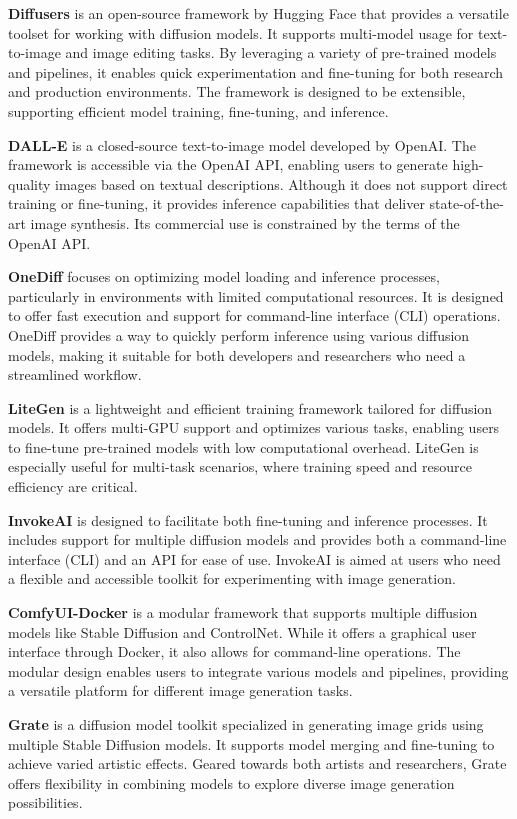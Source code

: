 \textbf{Diffusers} is an open-source framework by Hugging Face that provides a versatile toolset for working with diffusion models. It supports multi-model usage for text-to-image and image editing tasks. By leveraging a variety of pre-trained models and pipelines, it enables quick experimentation and fine-tuning for both research and production environments. The framework is designed to be extensible, supporting efficient model training, fine-tuning, and inference.

\textbf{DALL-E} is a closed-source text-to-image model developed by OpenAI. The framework is accessible via the OpenAI API, enabling users to generate high-quality images based on textual descriptions. Although it does not support direct training or fine-tuning, it provides inference capabilities that deliver state-of-the-art image synthesis. Its commercial use is constrained by the terms of the OpenAI API.

\textbf{OneDiff} focuses on optimizing model loading and inference processes, particularly in environments with limited computational resources. It is designed to offer fast execution and support for command-line interface (CLI) operations. OneDiff provides a way to quickly perform inference using various diffusion models, making it suitable for both developers and researchers who need a streamlined workflow.

\textbf{LiteGen} is a lightweight and efficient training framework tailored for diffusion models. It offers multi-GPU support and optimizes various tasks, enabling users to fine-tune pre-trained models with low computational overhead. LiteGen is especially useful for multi-task scenarios, where training speed and resource efficiency are critical.

\textbf{InvokeAI} is designed to facilitate both fine-tuning and inference processes. It includes support for multiple diffusion models and provides both a command-line interface (CLI) and an API for ease of use. InvokeAI is aimed at users who need a flexible and accessible toolkit for experimenting with image generation.

\textbf{ComfyUI-Docker} is a modular framework that supports multiple diffusion models like Stable Diffusion and ControlNet. While it offers a graphical user interface through Docker, it also allows for command-line operations. The modular design enables users to integrate various models and pipelines, providing a versatile platform for different image generation tasks.

\textbf{Grate} is a diffusion model toolkit specialized in generating image grids using multiple Stable Diffusion models. It supports model merging and fine-tuning to achieve varied artistic effects. Geared towards both artists and researchers, Grate offers flexibility in combining models to explore diverse image generation possibilities.


